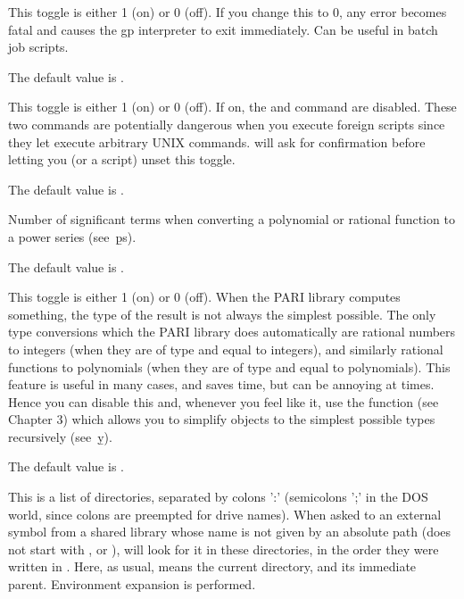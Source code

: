 {\label{se:def,recover}
This toggle is either 1 (on) or 0 (off). If you change this to $0$, any
error becomes fatal and causes the gp interpreter to exit immediately. Can be
useful in batch job scripts.

The default value is .

\label{se:def,secure}
This toggle is either 1 (on) or 0 (off). If on, the  and
 command are disabled. These two commands are potentially
dangerous when you execute foreign scripts since they let  execute
arbitrary UNIX commands.  will ask for confirmation before letting
you (or a script) unset this toggle.

The default value is .

\label{se:def,seriesprecision}
Number of significant terms
when converting a polynomial or rational function to a power series
(see~\b{ps}).

The default value is .

\label{se:def,simplify}
This toggle is either 1 (on) or 0 (off). When the PARI library computes
something, the type of the
result is not always the simplest possible. The only type conversions which
the PARI library does automatically are rational numbers to integers (when
they are of type  and equal to integers), and similarly rational
functions to polynomials (when they are of type  and equal to
polynomials). This feature is useful in many cases, and saves time, but can
be annoying at times. Hence you can disable this and, whenever you feel like
it, use the function  (see Chapter 3) which allows you to
simplify objects to the simplest possible types recursively (see~\b{y}).

The default value is .

\label{se:def,sopath}
This is a list of directories, separated by colons ':'
(semicolons ';' in the DOS world, since colons are preempted for drive names).
When asked to  an external symbol from a shared library whose
name is not given by an absolute path (does not start with \kbd{/}, 
or ),  will look for it in these directories, in the order
they were written in . Here, as usual,  means the current
directory, and  its immediate parent. Environment expansion is
performed.

}
